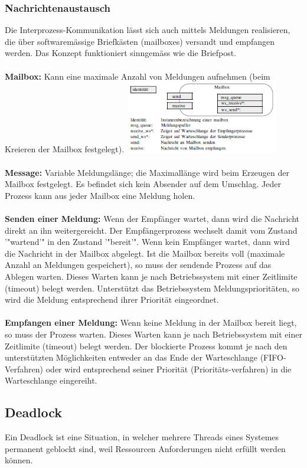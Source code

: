 \subsubsection{Nachrichtenaustausch}
Die Interprozess-Kommunikation lässt sich auch mittels Meldungen realisieren, die über softwaremässige Briefkästen (mailboxes) versandt und empfangen werden. Das Konzept funktioniert sinngemäss wie die Briefpost.\\\\
\textbf{Mailbox:} Kann eine maximale Anzahl von Meldungen aufnehmen (beim Kreieren
der Mailbox festgelegt).
\includegraphics[width=0.5\textwidth]{images/Betriebssysteme/Mailbox.png}\\\\
\textbf{Message:} Variable Meldungslänge; die Maximallänge wird beim Erzeugen der Mailbox
festgelegt. Es befindet sich kein Absender auf dem Umschlag. Jeder Prozess kann aus jeder Mailbox eine Meldung holen.\\\\
\textbf{Senden einer Meldung:}
Wenn der Empfänger wartet, dann wird die Nachricht direkt an ihn weitergereicht. Der Empfängerprozess wechselt damit vom Zustand '"wartend'" in den Zustand '"bereit'". Wenn kein Empfänger wartet, dann wird die Nachricht in der Mailbox abgelegt. Ist die Mailbox bereits voll (maximale Anzahl an Meldungen gespeichert),
so muss der sendende Prozess auf das Ablegen warten. Dieses Warten kann je nach Betriebssystem mit einer Zeitlimite (timeout) belegt werden. Unterstützt das Betriebssystem Meldungsprioritäten, so wird die Meldung
entsprechend ihrer Priorität eingeordnet.\\\\
\textbf{Empfangen einer Meldung:} Wenn keine Meldung in der Mailbox bereit liegt, so muss der Prozess warten. Dieses Warten kann je nach Betriebssystem mit einer Zeitlimite (timeout) belegt werden. Der blockierte Prozess kommt je nach den unterstützten Möglichkeiten entweder an das Ende der Warteschlange (FIFO-Verfahren) oder wird entsprechend seiner Priorität (Prioritäts-verfahren) in die Warteschlange eingereiht.

\subsection{Deadlock}
Ein Deadlock ist eine Situation, in welcher mehrere Threads eines Systemes permanent geblockt sind, weil Ressourcen Anforderungen nicht erfüllt werden können.

